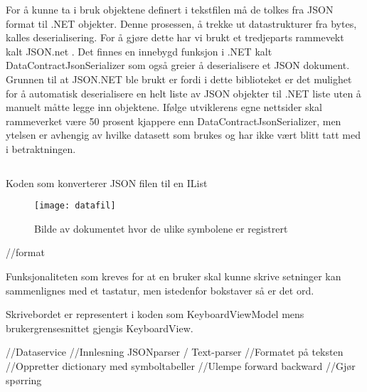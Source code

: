 {For å kunne ta i bruk objektene definert i tekstfilen må de tolkes fra JSON format til .NET objekter. Denne prosessen, å trekke ut datastrukturer fra bytes, kalles deserialisering. For å gjøre dette har vi brukt et tredjeparts rammevekt kalt JSON.net \cite{Json.0:online}. Det finnes en innebygd funksjon i .NET kalt DataContractJsonSerializer \cite{DataC3:online} som også greier å deserialisere et JSON dokument. Grunnen til at JSON.NET ble brukt er fordi i dette biblioteket er det mulighet for å automatisk deserialisere en helt liste av JSON objekter til .NET liste uten å manuelt måtte legge inn objektene. Ifølge utviklerens egne nettsider skal rammeverket være 50 prosent kjappere enn DataContractJsonSerializer, men ytelsen er avhengig av hvilke datasett som brukes og har ikke vært blitt tatt med i betraktningen. 


\begin{listing}[ht] 
\inputminted[fontsize=\footnotesize, frame=lines,framesep=2mm,baselinestretch=1.2,bgcolor=lightgray,linenos]{csharp}{Code/JSONparser.cs} 
\caption{Koden som konverterer JSON filen til en IList} 
\label{listing:JsonParser} 
\end{listing} 









\begin{figure}[ht!] 
\centering 
\texttt{[image: datafil]} 
\caption{Bilde av dokumentet hvor de ulike symbolene er registrert} 
\label{fig:skrivebord} 
\end{figure} 







//format









Funksjonaliteten som kreves for at en bruker skal kunne skrive setninger kan sammenlignes med et tastatur, men istedenfor bokstaver så er det ord.  



Skrivebordet er representert i koden som KeyboardViewModel mens brukergrensesnittet gjengis KeyboardView. 


//Dataservice
//Innlesning JSONparser / Text-parser
    //Formatet på teksten
    //Oppretter dictionary med symboltabeller
    //Ulempe forward backward
    //Gjør spørring
    




}

